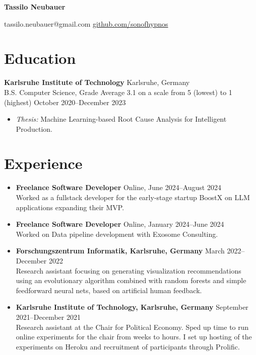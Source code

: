 \documentclass[letterpaper,10pt]{article}
\begin{document}
\begin{center}
\Huge\textbf{Tassilo Neubauer}

\vspace{0.5em}
\large
 \textcolor{accent}{tassilo.neubauer@gmail.com} \hspace{2em}
 \href{https://github.com/sonofhypnos}{github.com/sonofhypnos}
\end{center}

\section*{Education}
\textbf{Karlsruhe Institute of Technology} \hfill Karlsruhe, Germany \\
B.S. Computer Science, Grade Average 3.1 on a scale from 5 (lowest) to 1 (highest) \hfill October 2020--December 2023
\begin{itemize}
    \item \textit{Thesis:} Machine Learning-based Root Cause Analysis for Intelligent Production.
\end{itemize}



\section*{Experience}
\begin{itemize}
    \item \textbf{Freelance Software Developer} \hfill Online, June 2024--August 2024 \\
        Worked as a fullstack developer for the early-stage startup BoostX on LLM applications expanding their MVP.

    \item \textbf{Freelance Software Developer} \hfill Online, January 2024--June 2024 \\
        Worked on Data pipeline development with Exosome Consulting.
    \item \textbf{Forschungszentrum Informatik, Karlsruhe, Germany} \hfill March 2022--December 2022 \\
        Research assistant focusing on generating visualization recommendations using an
        evolutionary algorithm combined with random forests and simple feedforward neural nets,
        based on artificial human feedback.
    \item \textbf{Karlsruhe Institute of Technology, Karlsruhe, Germany} \hfill September 2021--December 2021 \\
        Research assistant at the Chair for Political Economy. Sped up time to run online experiments for the chair from
        weeks to hours. I set up hosting of the experiments on Heroku and recruitment of participants through Prolific.
\end{itemize}
\end{document}
